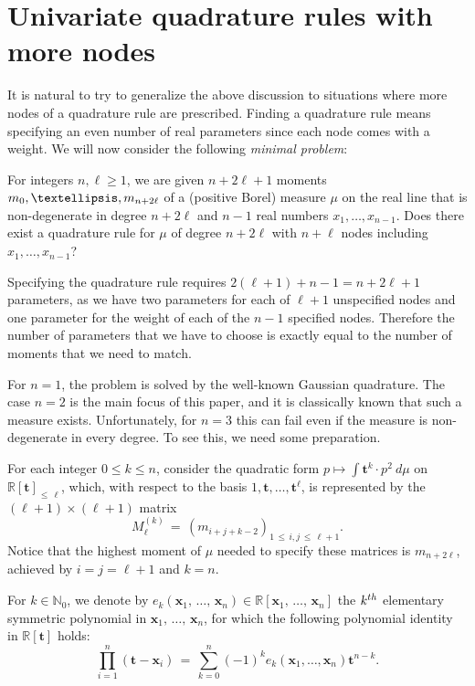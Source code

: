 \documentclass[11pt]{article}
\theoremstyle{definition}
\numberwithin{equation}{section}
\numberwithin{figure}{section}
\numberwithin{table}{section}
\newcommand\N{\mathbb N}
\newcommand\R{\mathbb R}
\renewcommand\t{\mathbf{t}}
\newcommand\x{\mathbf{x}}
\begin{document}
\section{Univariate quadrature rules with more nodes}\label{sec:Generalizations}

It is natural to try to generalize the above discussion to situations where more nodes of a quadrature rule are prescribed. Finding a quadrature rule means specifying an even number of real parameters since each node comes with a weight. We will now consider the following \emph{minimal problem}:

\begin{prob} \label{prob:UnivariateGeneralization}
For integers $n,\ell \geq 1$, we are given $n+2\ell+1$ moments $m_0,\dots, \linebreak m_{n+2\ell}$ of a (positive Borel) measure $\mu$ on the real line that is non-degenerate in degree $n+2\ell$ and $n-1$ real numbers $x_1,\dots, x_{n-1}$. Does there exist a quadrature rule for $\mu$ of degree $n+2\ell$ with $n+\ell$ nodes including $x_1,\dots, x_{n-1}$?
\end{prob}

Specifying the quadrature rule requires $2(\ell+1)+n-1=n+2\ell+1$ parameters, as we have two parameters for each of $\ell+1$ unspecified nodes and one parameter for the weight of each of the $n-1$ specified nodes. Therefore the number of parameters that we have to choose is exactly equal to the number of moments that we need to match.

For $n=1$, the problem is solved by the well-known Gaussian quadrature. The case $n=2$ is the main focus of this paper, and it is classically known that such a measure exists. Unfortunately, for $n=3$ this can fail even if the measure is non-degenerate in every degree. To see this, we need some preparation.


For each integer $0 \leq k \leq n$, consider the quadratic form $p \mapsto \int \t^k \cdot p^2 \ d \mu$ on $\R[\t]_{\leq\,\ell}$, which, with respect to the basis $1,\t,\hdots, \t^{\ell}$, is represented by the $(\ell+1)\times (\ell+1)$ matrix
\[
M^{(k)}_{\ell} \, = \, (m_{i+j+k-2})_{1\,\leq\, i,j\,\leq\,\ell+1}.
\]
Notice that the highest moment of $\mu$ needed to specify these matrices is $m_{n+2\ell}$, achieved by $i = j = \ell+1$ and $k = n$.

For $k\in\N_0$, we denote by $e_k(\x_1,\,\dots,\,\x_n) \in \R[\x_1,\,\hdots,\,\x_n]$ the $k^{\rm th}$ elementary symmetric polynomial in $\x_1,\,\hdots,\,\x_n$, for which the following polynomial identity in $\R[\t]$ holds:
\[
\prod_{i=1}^n(\t-\x_i) \, = \, \sum_{k=0}^n(-1)^ke_k(\x_1,\dots,\x_n)\t^{n-k}.
\]
\end{document}
